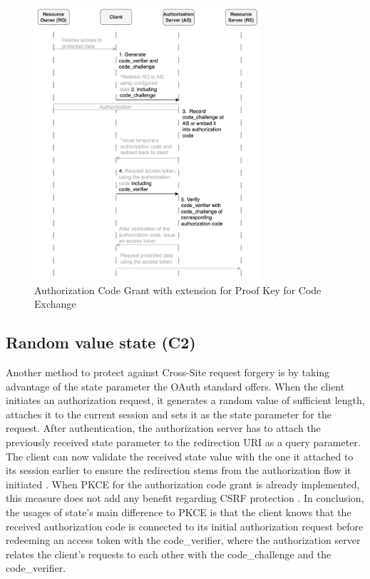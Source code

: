 \documentclass[
    fontsize=12pt,
    headings=small,
    parskip=half,           %
    bibliography=totoc,
    numbers=noenddot,       %
    open=any,               %
    ]{scrreprt}
\begin{document}
\begin{figure}[ht]
	\sffamily\footnotesize
	\includegraphics[width=0.75\textwidth]{pic/PKCE.png}
	\unitlength=0.75mm
	\linethickness{0.4pt}
	\caption{Authorization Code Grant with extension for Proof Key for Code Exchange}
	\label{fig:pkce}
\end{figure}

\subsection[Random value state]{Random value state (C2)}
\label{counter:C2}
Another method to protect against Cross-Site request forgery is by taking advantage of the state parameter the OAuth standard offers. When the client initiates an authorization request, it generates a random value of sufficient length, attaches it to the current session and sets it as the state parameter for the request. After authentication, the authorization server has to attach the previously received state parameter to the redirection URI as a query parameter. The client can now validate the received state value with the one it attached to its session earlier to ensure the redirection stems from the authorization flow it initiated \cite{ferry2015security}. When PKCE for the authorization code grant is already implemented, this measure does not add any benefit regarding CSRF protection \cite{bradley2015rfc}. In conclusion, the usages of state's main difference to PKCE is that the client knows that the received authorization code is connected to its initial authorization request before redeeming an access token with the code\_verifier, where the authorization server relates the client's requests to each other with the code\_challenge and the code\_verifier.
\end{document}

